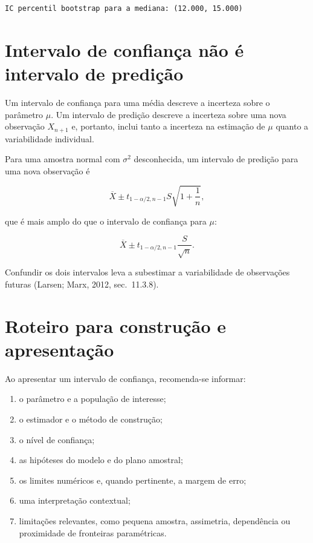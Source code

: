 \documentclass[
  letterpaper,
  DIV=11,
  numbers=noendperiod]{scrreprt}
\providecommand{\tightlist}{%
  \setlength{\itemsep}{0pt}\setlength{\parskip}{0pt}}\usepackage{longtable,booktabs,array}
\begin{document}
\begin{verbatim}
IC percentil bootstrap para a mediana: (12.000, 15.000)
\end{verbatim}

\section{Intervalo de confiança não é intervalo de
predição}\label{intervalo-de-confianuxe7a-nuxe3o-uxe9-intervalo-de-prediuxe7uxe3o}

Um intervalo de confiança para uma média descreve a incerteza sobre o
parâmetro \(\mu\). Um intervalo de predição descreve a incerteza sobre
uma nova observação \(X_{n+1}\) e, portanto, inclui tanto a incerteza na
estimação de \(\mu\) quanto a variabilidade individual.

Para uma amostra normal com \(\sigma^2\) desconhecida, um intervalo de
predição para uma nova observação é

\[\overline X\pm t_{1-\alpha/2,n-1}S\sqrt{1+\frac{1}{n}},\]

que é mais amplo do que o intervalo de confiança para \(\mu\):

\[\overline X\pm t_{1-\alpha/2,n-1}\frac{S}{\sqrt n}.\]

Confundir os dois intervalos leva a subestimar a variabilidade de
observações futuras (Larsen; Marx, 2012, sec.~11.3.8).

\section{Roteiro para construção e
apresentação}\label{roteiro-para-construuxe7uxe3o-e-apresentauxe7uxe3o}

Ao apresentar um intervalo de confiança, recomenda-se informar:

\begin{enumerate}
\def\labelenumi{\arabic{enumi}.}
\tightlist
\item
  o parâmetro e a população de interesse;
\item
  o estimador e o método de construção;
\item
  o nível de confiança;
\item
  as hipóteses do modelo e do plano amostral;
\item
  os limites numéricos e, quando pertinente, a margem de erro;
\item
  uma interpretação contextual;
\item
  limitações relevantes, como pequena amostra, assimetria, dependência
  ou proximidade de fronteiras paramétricas.
\end{enumerate}
\end{document}
